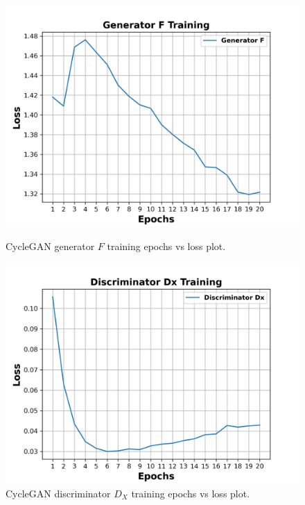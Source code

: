 \begin{figure}[H]
  \centering
  \begin{minipage}[b]{0.49\textwidth}
    \includegraphics[width=\textwidth]{images/Evaluation/GeneratorFTraining.png}
    \caption[\ac{CycleGAN} generator $F$ training epochs vs loss plot.]{\ac{CycleGAN} generator $F$ training epochs vs loss plot.}
    \label{fig:generatorF}
  \end{minipage}
  \hfill
  \begin{minipage}[b]{0.49\textwidth}
    \includegraphics[width=\textwidth]{images/Evaluation/DiscriminatorDxTraining.png}
    \caption[\ac{CycleGAN} discriminator $D_X$ training epochs vs loss plot.]{\ac{CycleGAN} discriminator $D_X$ training epochs vs loss plot.}
    \label{fig:discriminatorDx}
  \end{minipage}
\end{figure}

